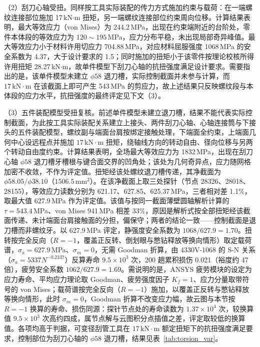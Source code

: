 （2）刮刀心轴受扭。同样按工具实际装配的传力方式施加约束与载荷：在一端螺纹连接部位施加 17\,kN$\cdot$m 扭矩，另一端螺纹连接部位约束周向位移。计算结果表明，最大等效应力（von Mises）为 244.2\,MPa，出现在约束端附近的台阶处，零件本体段的等效应力为 $120\sim195$\,MPa，应力分布平稳，未出现局部奇异峰值。最大等效应力小于材料许用切应力 704.88\,MPa，对应材料屈服强度 1068\,MPa 的安全系数为 4.37，大于设计要求的 1.5；同时施加的扭矩小于该零件按理论校核所得许用扭矩 28.27\,kN$\cdot$m，故单件模型下刮刀心轴的抗扭强度满足设计要求。需要指出的是，该单件模型未建立 $\phi 58$ 退刀槽，实际控制截面并未参与计算，而 $17\,\mathrm{kN}\cdot\mathrm{m}$ 在该截面上即可产生 543\,MPa 的剪应力，故上述结果只反映螺纹段与本体段的应力水平，抗扭强度的最终评定见下文（3）。

（3）五件装配模型受扭复核。前述单件模型未建立退刀槽，结果不能代表实际控制截面，为此按工具实际装配关系建立上接头、两件刮刀心轴、心轴连接筒与下接头的五件装配模型，螺纹副与端面台肩按绑定接触处理，下端面全约束，上端面几何中心设远程点并施加 $17\,\mathrm{kN}\cdot\mathrm{m}$ 扭矩，绕轴线方向的转动自由、径向位移与另两个转动自由度约束。计算结果表明，全场最大等效应力为 1832\,MPa，出现在刮刀心轴 $\phi 58$ 退刀槽牙槽根与键合面交界的凹角处；该处为几何奇异点，应力随网格加密不收敛，不作为评定值。扭矩经该处螺纹退刀槽传递，其净截面为 $\phi 58.05/\phi 38.10$（$1506.5\,\mathrm{mm}^2$）。在该净截面上取三处探针（节点 28326、28018、28155），等效应力读数分别为 621.17、627.85、625.37\,MPa，三者相对差 1.1\%，取最大值 627.9\,MPa 作为评定值。该值与按同一截面薄壁圆轴解析计算的 $\tau=543.4$\,MPa、von Mises 941\,MPa 相差 33\%，原因是解析式按全部扭矩经该截面传递、未计端面台肩接触面的分担，偏保守；两者的结论一致——控制截面是退刀槽而非螺纹牙。以 627.9\,MPa 评定，静强度安全系数为 $1068/627.9=1.70$。扭转按完全反向（$R=-1$，覆盖正反转、倒划眼与憋钻释放等换向情形）取定载荷谱，$\sigma_a=627.9$\,MPa、$\sigma_m=0$，无需 Goodman 折算，由 4330V-1068 的 S-N 关系（$\sigma_a=5337N^{-0.2337}$）反算寿命 $9.5\times10^{3}$ 次，200 趟累积损伤 0.021（裕度约 47 倍），疲劳安全系数 $1062/627.9=1.69$。需说明的是，ANSYS 疲劳模块的设定为应力寿命、平均应力理论取 Goodman、疲劳强度因子 $K_f=1$、应力分量取带符号的 von Mises；载荷谱按完全反向（$R=-1$）施加，以覆盖正反转与憋钻释放等换向情形，此时 $\sigma_m=0$，Goodman 折算不改变应力幅，故云图与本节按 $R=-1$ 换算的寿命、损伤同源：探针节点处的寿命读数为 $1.37\times10^{4}$ 次，较换算值 $9.5\times10^{3}$ 次高约四成，属节点解与云图积分点插值之差，评定取较低的换算值。各项均高于判据，可变径刮管工具在 $17\,\mathrm{kN}\cdot\mathrm{m}$ 额定扭矩下的抗扭强度满足要求，控制部位为刮刀心轴的 $\phi 58$ 退刀槽，结果见表~\ref{tab:torsion_var}。

